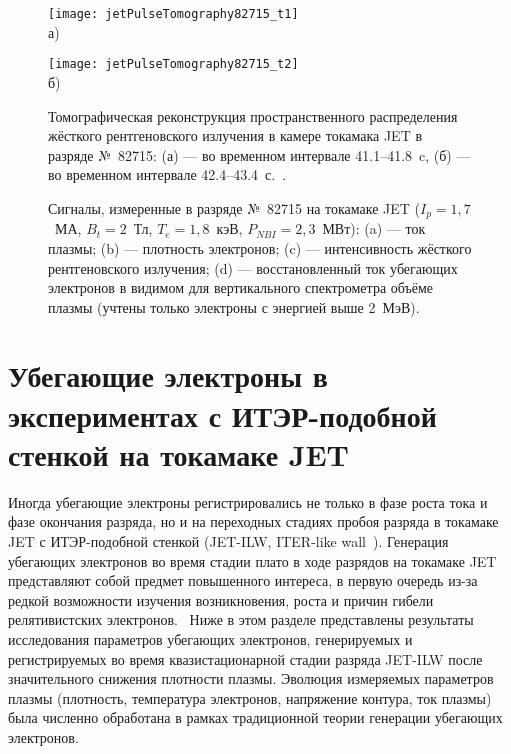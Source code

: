 \begin{figure}[ht]
    \begin{minipage}[b][][b]{0.48\linewidth}\centering
        \texttt{[image: jetPulseTomography82715\_t1]} \\ а)
    \end{minipage}
    \hfill
    \begin{minipage}[b][][b]{0.48\linewidth}\centering
        \texttt{[image: jetPulseTomography82715\_t2]} \\ б)
    \end{minipage}
    \caption{ Томографическая реконструкция пространственного распределения жёсткого рентгеновского излучения в камере токамака JET в разряде №~82715: (а) --- во временном интервале 41.1--41.8~c, (б) --- во временном интервале 42.4--43.4~с.~\cite{Shevelev2013a}. }
    \label{fig:jetPulseTomography82715}
\end{figure}

\begin{figure}[ht!]
  \caption{ Сигналы, измеренные в разряде №~82715 на токамаке JET ($I_p = 1,7$~МА, $B_t = 2$~Тл, $T_e = 1,8$~кэВ, $P_{NBI} = 2,3$~МВт): (a) --- ток плазмы; (b) ---  плотность электронов; (c) ---  интенсивность жёсткого рентгеновского излучения; (d) --- восстановленный ток убегающих электронов в видимом для вертикального спектрометра объёме плазмы (учтены только электроны с энергией выше 2~МэВ).~\cite{Shevelev2013} }
  \label{fig:jetPulseParams82715}
\end{figure}



\FloatBarrier
\section{Убегающие электроны в экспериментах с ИТЭР-подобной стенкой на токамаке JET}

Иногда убегающие электроны регистрировались не только в фазе роста тока и фазе окончания разряда, но и на переходных стадиях пробоя разряда в токамаке JET с ИТЭР-подобной стенкой (JET-ILW, ITER-like wall~\cite{Matthews2011}). Генерация убегающих электронов во время стадии плато в ходе разрядов на токамаке JET представляют собой предмет повышенного интереса, в первую очередь из-за редкой возможности изучения возникновения, роста и причин гибели релятивистских электронов.~\cite{Granetz2014} Ниже в этом разделе представлены результаты исследования параметров убегающих электронов, генерируемых и регистрируемых во время квазистационарной стадии разряда JET-ILW после значительного снижения плотности плазмы. Эволюция измеряемых параметров плазмы (плотность, температура электронов, напряжение контура, ток плазмы) была численно обработана в рамках традиционной теории генерации убегающих электронов.~\cite{Plyusnin2015}

